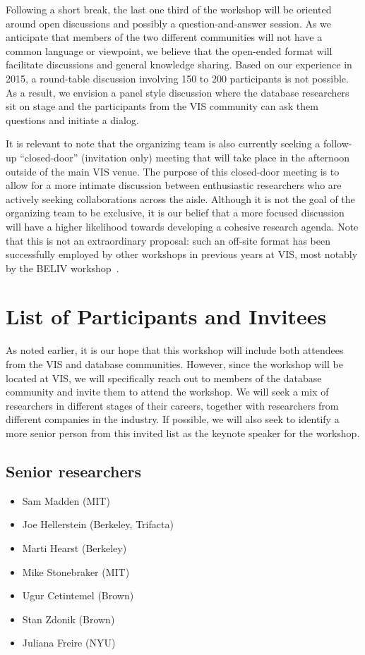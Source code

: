 \documentclass[journal]{vgtc}                %
\begin{document}
Following a short break, the last one third of the workshop will be oriented around open discussions and possibly a question-and-answer session. 
As we anticipate that members of the two different communities will not have a common language or viewpoint, we believe that the open-ended format will facilitate discussions and general knowledge sharing.
Based on our experience in 2015, a round-table discussion involving 150 to 200 participants is not possible.
As a result, we envision a panel style discussion where the database researchers sit on stage and the participants from the VIS community can ask them questions and initiate a dialog.

It is relevant to note that the organizing team is also currently seeking a follow-up ``closed-door'' (invitation only) meeting that will take place in the afternoon outside of the main VIS venue. 
The purpose of this closed-door meeting is to allow for a more intimate discussion between enthusiastic researchers who are actively seeking collaborations across the aisle. 
Although it is not the goal of the organizing team to be exclusive, it is our belief that a more focused
discussion will have a higher likelihood towards developing a cohesive research agenda. 
Note that this is not an extraordinary proposal: such an off-site format has been successfully employed by other workshops in previous years at VIS, most notably by the BELIV workshop~\cite{beliv}.

\section{List of Participants and Invitees}
\label{sec:invitees}

As noted earlier, it is our hope that this workshop will include both attendees from the VIS and database communities. 
However, since the workshop will be located at VIS, we will specifically reach out to members of the database community and invite them to attend the workshop. 
We will seek a mix of researchers in different stages of their careers, together with researchers from different companies in the industry. 
If possible, we will also seek to identify a more senior person from this invited list as the keynote speaker for the workshop.

\subsection*{Senior researchers}
\begin{itemize}[topsep=0pt, partopsep=0pt, itemsep=-3pt]
\item Sam Madden (MIT)
\item Joe Hellerstein (Berkeley, Trifacta)
\item Marti Hearst (Berkeley)
\item Mike Stonebraker (MIT)
\item Ugur Cetintemel (Brown)
\item Stan Zdonik (Brown)
\item Juliana Freire (NYU)
\end{itemize}
\end{document}
